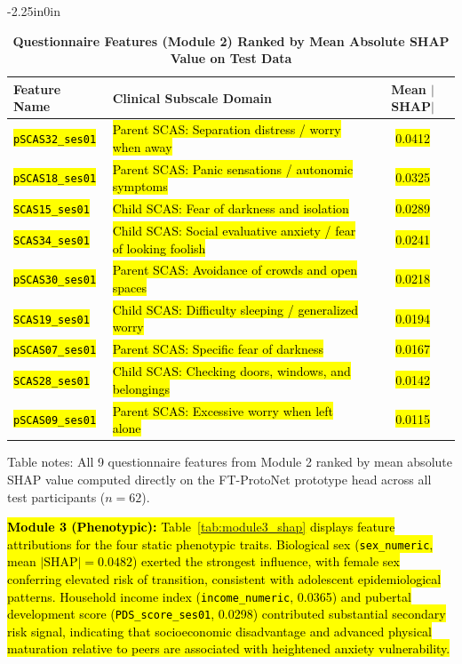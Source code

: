 \documentclass[10pt,letterpaper]{article}
\begin{document}
\begin{table}[!t]
\begin{adjustwidth}{-2.25in}{0in}
\centering
\caption{\textbf{Questionnaire Features (Module 2) Ranked by Mean Absolute SHAP Value on Test Data}}
\label{tab:module2_shap}
\footnotesize
\renewcommand{\arraystretch}{1.2}
\begin{tabular}{|l|l|c|}
\hline
\textbf{Feature Name} & \textbf{Clinical Subscale Domain} & \textbf{Mean $|$SHAP$|$} \\
\hline
\hl{\texttt{pSCAS32\_ses01}} & \hl{Parent SCAS: Separation distress / worry when away} & \hl{0.0412} \\
\hline
\hl{\texttt{pSCAS18\_ses01}} & \hl{Parent SCAS: Panic sensations / autonomic symptoms} & \hl{0.0325} \\
\hline
\hl{\texttt{SCAS15\_ses01}} & \hl{Child SCAS: Fear of darkness and isolation} & \hl{0.0289} \\
\hline
\hl{\texttt{SCAS34\_ses01}} & \hl{Child SCAS: Social evaluative anxiety / fear of looking foolish} & \hl{0.0241} \\
\hline
\hl{\texttt{pSCAS30\_ses01}} & \hl{Parent SCAS: Avoidance of crowds and open spaces} & \hl{0.0218} \\
\hline
\hl{\texttt{SCAS19\_ses01}} & \hl{Child SCAS: Difficulty sleeping / generalized worry} & \hl{0.0194} \\
\hline
\hl{\texttt{pSCAS07\_ses01}} & \hl{Parent SCAS: Specific fear of darkness} & \hl{0.0167} \\
\hline
\hl{\texttt{SCAS28\_ses01}} & \hl{Child SCAS: Checking doors, windows, and belongings} & \hl{0.0142} \\
\hline
\hl{\texttt{pSCAS09\_ses01}} & \hl{Parent SCAS: Excessive worry when left alone} & \hl{0.0115} \\
\hline
\end{tabular}
\begin{flushleft}
Table notes: All 9 questionnaire features from Module 2 ranked by mean absolute SHAP value computed directly on the FT-ProtoNet prototype head across all test participants ($n=62$).
\end{flushleft}
\end{adjustwidth}
\end{table}

\hl{\textbf{Module 3 (Phenotypic):} Table~\ref{tab:module3_shap} displays feature attributions for the four static phenotypic traits. Biological sex (\texttt{sex\_numeric}, mean $|\mathrm{SHAP}| = 0.0482$) exerted the strongest influence, with female sex conferring elevated risk of transition, consistent with adolescent epidemiological patterns. Household income index (\texttt{income\_numeric}, 0.0365) and pubertal development score (\texttt{PDS\_score\_ses01}, 0.0298) contributed substantial secondary risk signal, indicating that socioeconomic disadvantage and advanced physical maturation relative to peers are associated with heightened anxiety vulnerability.}
\end{document}
